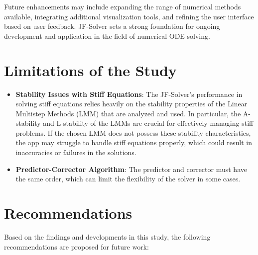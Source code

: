 Future enhancements may include expanding the range of numerical methods available, integrating additional visualization tools, and refining the user interface based on user feedback. JF-Solver sets a strong foundation for ongoing development and application in the field of numerical ODE solving.


\section{Limitations of the Study}
\begin{itemize}
  \item \textbf{Stability Issues with Stiff Equations}: The JF-Solver's performance in solving stiff equations relies heavily on the stability properties of the Linear Multistep Methods (LMM) that are analyzed and used. In particular, the A-stability and L-stability of the LMMs are crucial for effectively managing stiff problems. If the chosen LMM does not possess these stability characteristics, the app may struggle to handle stiff equations properly, which could result in inaccuracies or failures in the solutions.
  \item \textbf{Predictor-Corrector Algorithm}: The predictor and corrector must have the same order, which can limit the flexibility of the solver in some cases.
\end{itemize}



\section{Recommendations}

Based on the findings and developments in this study, the following recommendations are proposed for future work:

